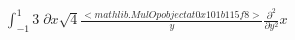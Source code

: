 \documentclass[border={2pt 2pt 2pt 2pt}]{standalone}
\begin{document}
$
\displaystyle \int_{-1}^{1} 3\;\partial x \sqrt{4} \frac{<mathlib.MulOp object at 0x101b115f8>}{y} \frac{\partial^{2}}{\partial y^{2}}x 
$
\end{document}
